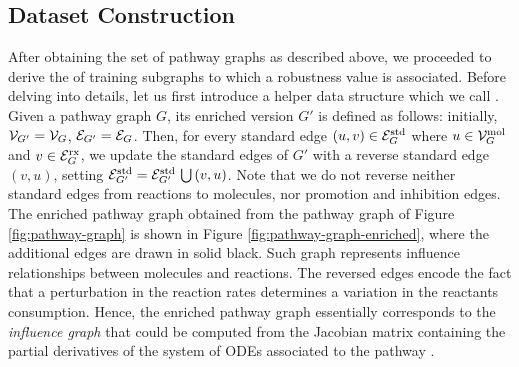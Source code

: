 \subsection{Dataset Construction}
After obtaining the set of pathway graphs as described above, we proceeded to derive the of training subgraphs to which a robustness value is associated. Before delving into details, let us first introduce a helper data structure which we call . Given a pathway graph $G$, its enriched version $G'$ is defined as follows: initially, $\Cal{V}_{G'}=\Cal{V}_G$, $\Cal{E}_{G'}=\Cal{E}_G$. Then, for every standard edge $(u, v) \in \Cal{E}_{G}^{\Fun{std}}$ where $u \in \Cal{V}_{G}^{\Fun{mol}}$ and $v \in \Cal{E}_{G}^{\Fun{rx}}$, we update the standard edges of $G'$ with a reverse standard edge $(v,u)$, setting $\Cal{E}_{G'}^{\Fun{std}} = \Cal{E}_{G'}^{\Fun{std}} \Union (v, u)$. Note that we do not reverse neither standard edges from reactions to molecules, nor promotion and inhibition edges. The enriched pathway graph obtained from the pathway graph of Figure \ref{fig:pathway-graph} is shown in Figure \ref{fig:pathway-graph-enriched}, where the additional edges are drawn in solid black. Such graph represents influence relationships between molecules and reactions. The reversed edges encode the fact that a perturbation in the reaction rates determines a variation in the reactants consumption. Hence, the enriched pathway graph essentially corresponds to the \emph{influence graph} that could be computed from the Jacobian matrix containing the partial derivatives of the system of ODEs associated to the pathway \cite{?}.
\begin{figure*}[h!]
    \centering
    \resizebox{.6\textwidth}{!}{}
    \caption{The enriched pathway graph obtained from the pathway graph of Figure \ref{fig:pathway-graph}. The edges added with respect to the original graph are shown in black.}
    \label{fig:pathway-graph-enriched}
\end{figure*}
